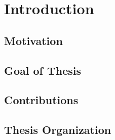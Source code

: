 \chapter{Introduction}
\newpage
\section{Motivation}
\newpage
\section{Goal of Thesis}\label{goal}
\newpage
\section{Contributions}
\newpage
\section{Thesis Organization}